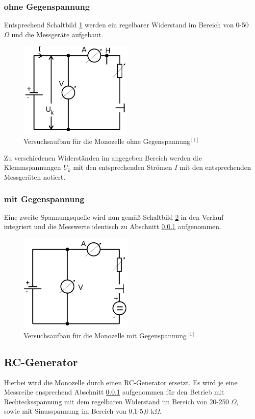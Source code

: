 \subsubsection{ohne Gegenspannung}
\label{sec_ogegen}
Entsprechend Schaltbild \ref{pic_ogegenspannung} werden ein regelbarer Widerstand im Bereich von 0-50 $\Omega$ und die Messgeräte aufgebaut.
\begin{figure}[H]
 \includegraphics[width=0.5\textwidth]{pics/ohne.png}
 \caption{Versuchsaufbau für die Monozelle ohne Gegenspannung$^{[1]}$}
 \label{pic_ogegenspannung}
\end{figure}
Zu verschiedenen Widerständen im angegeben Bereich werden die Klemmspannungen $U_k$ mit den entsprechenden Strömen $I$ mit den entsprechenden
Messgeräten notiert.
\subsubsection{mit Gegenspannung}
Eine zweite Spannungsquelle wird nun gemäß Schaltbild \ref{pic_mgegenspannung} in den Verlauf integriert und die Messwerte identisch zu Abschnitt
\ref{sec_ogegen} aufgenommen.
\begin{figure}[H]
 \includegraphics[width=0.5\textwidth]{pics/mit.png}
 \caption{Versuchsaufbau für die Monozelle mit Gegenspannung$^{[1]}$}
 \label{pic_mgegenspannung}
\end{figure}
\subsection{RC-Generator}
Hierbei wird die Monozelle durch einen RC-Generator ersetzt. Es wird je eine Messreihe ensprechend Abschnitt \ref{sec_ogegen} aufgenommen
für den Betrieb mit Rechtecksspannung mit dem regelbaren Widerstand im Bereich von 20-250 $\Omega$, sowie mit Sinusspannung im Bereich von
0,1-5,0 k$\Omega$.

